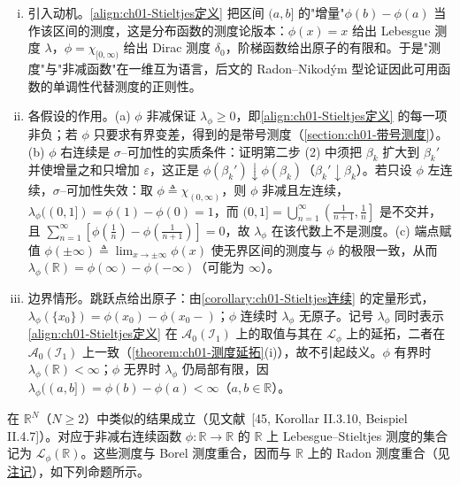 \documentclass[../../main.tex]{subfiles}%
\begin{document}
\begin{remark}\label{remark:ch01-Stieltjes测度构造}
\begin{enumerate}[(i)]
\item 引入动机。\eqref{align:ch01-Stieltjes定义} 把区间 $(a,b]$ 的"增量"$\phi(b)-\phi(a)$ 当作该区间的测度，这是分布函数的测度论版本：$\phi(x)=x$ 给出 Lebesgue 测度 $\lambda$，$\phi=\chi_{[0,\infty)}$ 给出 Dirac 测度 $\delta_0$，阶梯函数给出原子的有限和。于是"测度"与"非减函数"在一维互为语言，后文的 Radon--Nikodým 型论证因此可用函数的单调性代替测度的正则性。
\item 各假设的作用。(a) $\phi$ 非减保证 $\lambda_\phi\geqslant0$，即\eqref{align:ch01-Stieltjes定义} 的每一项非负；若 $\phi$ 只要求有界变差，得到的是带号测度（\cref{section:ch01-带号测度}）。(b) $\phi$ 右连续是 $\sigma$--可加性的实质条件：证明第二步 (2) 中须把 $\beta_k$ 扩大到 $\beta_k'$ 并使增量之和只增加 $\varepsilon$，这正是 $\phi(\beta_k')\downarrow\phi(\beta_k)$（$\beta_k'\downarrow\beta_k$）。若只设 $\phi$ 左连续，$\sigma$--可加性失效：取 $\phi\triangleq\chi_{(0,\infty)}$，则 $\phi$ 非减且左连续，$\lambda_\phi((0,1])=\phi(1)-\phi(0)=1$，而 $(0,1]=\bigcup_{n=1}^\infty\left(\frac{1}{n+1},\frac{1}{n}\right]$ 是不交并，且 $\sum_{n=1}^\infty\left[\phi\left(\frac{1}{n}\right)-\phi\left(\frac{1}{n+1}\right)\right]=0$，故 $\lambda_\phi$ 在该代数上不是测度。(c) 端点赋值 $\phi(\pm\infty)\triangleq\lim_{x\to\pm\infty}\phi(x)$ 使无界区间的测度与 $\phi$ 的极限一致，从而 $\lambda_\phi(\mathbb{R})=\phi(\infty)-\phi(-\infty)$（可能为 $\infty$）。
\item 边界情形。跳跃点给出原子：由\cref{corollary:ch01-Stieltjes连续} 的定量形式，$\lambda_\phi(\{x_0\})=\phi(x_0)-\phi(x_0-)$；$\phi$ 连续时 $\lambda_\phi$ 无原子。记号 $\lambda_\phi$ 同时表示\eqref{align:ch01-Stieltjes定义} 在 $\mathcal{A}_0(\mathcal{I}_1)$ 上的取值与其在 $\mathcal{L}_\phi$ 上的延拓，二者在 $\mathcal{A}_0(\mathcal{I}_1)$ 上一致（\cref{theorem:ch01-测度延拓}(i)），故不引起歧义。$\phi$ 有界时 $\lambda_\phi(\mathbb{R})<\infty$；$\phi$ 无界时 $\lambda_\phi$ 仍局部有限，因 $\lambda_\phi((a,b])=\phi(b)-\phi(a)<\infty$（$a,b\in\mathbb{R}$）。
\end{enumerate}
\end{remark}

在 $\mathbb{R}^N$（$N\geqslant2$）中类似的结果成立（见文献~[45, Korollar II.3.10, Beispiel II.4.7]）。对应于非减右连续函数 $\phi:\mathbb{R}\to\mathbb{R}$ 的 $\mathbb{R}$ 上 Lebesgue--Stieltjes 测度的集合记为 $\mathcal{L}_\phi(\mathbb{R})$。这些测度与 Borel 测度重合，因而与 $\mathbb{R}$ 上的 Radon 测度重合（见\hyperref[remark:ch01-BorelRadon一致]{注记}），如下列命题所示。
\end{document}
